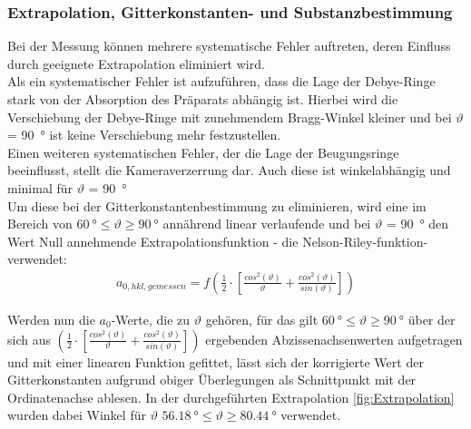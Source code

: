 \documentclass[a4paper,twoside,final]{article}
\begin{document}
\subsubsection{Extrapolation, Gitterkonstanten- und Substanzbestimmung}
Bei der Messung können mehrere systematische Fehler auftreten, deren Einfluss durch geeignete Extrapolation eliminiert wird.\\ Als ein systematischer Fehler ist aufzuführen, dass die Lage der Debye-Ringe stark von der Absorption des Präparats abhängig ist. Hierbei wird die Verschiebung der Debye-Ringe mit zunehmendem Bragg-Winkel kleiner und bei $\vartheta$ = \SI{90}{\degree} ist keine Verschiebung mehr festzustellen. \\
Einen weiteren systematischen Fehler, der die Lage der Beugungsringe beeinflusst, stellt die Kameraverzerrung dar. Auch diese ist winkelabhängig und minimal für $\vartheta$ = \SI{90}{\degree}\\
Um diese bei der Gitterkonstantenbestimmung zu eliminieren, wird eine im Bereich von $\SI{60}{\degree} \leq \vartheta \geq \SI{90}{\degree}$ annährend linear verlaufende und bei $\vartheta$ = \SI{90}{\degree} den Wert Null annehmende Extrapolationsfunktion - die Nelson-Riley-funktion- verwendet: \\
\begin{align}
  a_{0,hkl,gemessen} = f(\frac{1}{2}\cdot[\frac{cos^2(\vartheta)}{\vartheta}+\frac{cos^2(\vartheta)}{sin(\vartheta)}])
\end{align}

Werden nun die $a_{0}$-Werte, die zu $\vartheta$ gehören, für das gilt $\SI{60}{\degree} \leq \vartheta \geq \SI{90}{\degree}$ über der sich aus $(\frac{1}{2}\cdot[\frac{cos^2(\vartheta)}{\vartheta}+\frac{cos^2(\vartheta)}{sin(\vartheta)}])$ ergebenden Abzissenachsenwerten aufgetragen und mit einer linearen Funktion gefittet, lässt sich der korrigierte Wert der Gitterkonstanten aufgrund obiger Überlegungen als Schnittpunkt mit der Ordinatenachse ablesen. In der durchgeführten Extrapolation \ref{fig:Extrapolation} wurden dabei Winkel für $\vartheta$ $\SI{56,18}{\degree} \leq \vartheta \geq \SI{80,44}{\degree}$ verwendet.
\end{document}
